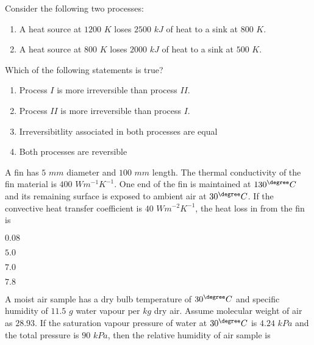 \iffalse
	\title{2010-ME-40-52}
	\author{EE24Btech11024 - G. Abhimanyu Koushik}
	\section{me}
	\chapter{2010}
\fi

\item Consider the following two processes:
\begin{enumerate}[label=\alph*., leftmargin=2cm, labelsep=1cm]
    \item A heat source at $1200$ $K$ loses $2500$ $kJ$ of heat to a sink at $800$ $K$.
    \item A heat source at $800$ $K$ loses $2000$ $kJ$ of heat to a sink at $500$ $K$.
\end{enumerate}
Which of the following statements is true?

\hfill{}
\begin{enumerate}
\item Process $I$ is more irreversible than process $II$.
\item Process $II$ is more irreversible than process $I$.
\item Irreversibitlity associated in both processes are equal
\item Both processes are reversible
\end{enumerate}

\item A fin has $5$ $mm$ diameter and $100$ $mm$ length. The thermal conductivity of the fin material is $400$ $Wm^{-1}K^{-1}$. One end of the fin is maintained at $130^{{\degree}} C$ and its remaining surface is exposed to ambient air at $30^{{\degree}} C$. If the convective heat transfer coefficient is $40$ $Wm^{-2}K^{-1}$, the heat loss in  from the fin is

\hfill{}
\begin{enumerate}
\begin{multicols}{4}
\item $0.08$
\item $5.0$
\item $7.0$
\item $7.8$
\end{multicols}
\end{enumerate}

\item A moist air sample has a dry bulb temperature of $30^{{\degree}} C$ and specific humidity of $11.5$ $g$ water vapour per $kg$ dry air. Assume molecular weight of air as $28.93$. If the saturation vapour pressure of water at $30^{{\degree}} C$ is $4.24$ $kPa$ and the total pressure is $90$ $kPa$, then the relative humidity  of air sample is

